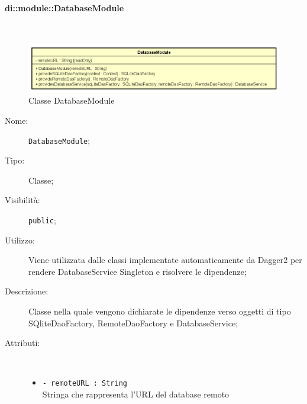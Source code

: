 \documentclass[../DefinizioneDiProdotto.tex]{subfiles}
\begin{document}
\paragraph{di::module::DatabaseModule}
\
\begin{figure}[H]
	\centering
	\includegraphics[width=\maxwidth]{img/DatabaseModule.png}
	\caption{Classe DatabaseModule}\label{fig:di::module::DatabaseModule} 
\end{figure}
\begin{description}
	\item[Nome:] \texttt{DatabaseModule};
	\item[Tipo:] Classe;
	\item[Visibilità:] \texttt{public};
	\item[Utilizzo:] Viene utilizzata dalle classi implementate automaticamente da Dagger2 per rendere DatabaseService Singleton e risolvere le dipendenze;
	\item[Descrizione:] Classe nella quale vengono dichiarate le dipendenze verso oggetti di tipo SQliteDaoFactory,
	RemoteDaoFactory e DatabaseService;
	\item[Attributi:] \
	\begin{itemize}
		\item \texttt{- remoteURL : String}\\
		Stringa che rappresenta l'URL del database remoto
		

\end{itemize}
\end{description}
\end{document}
